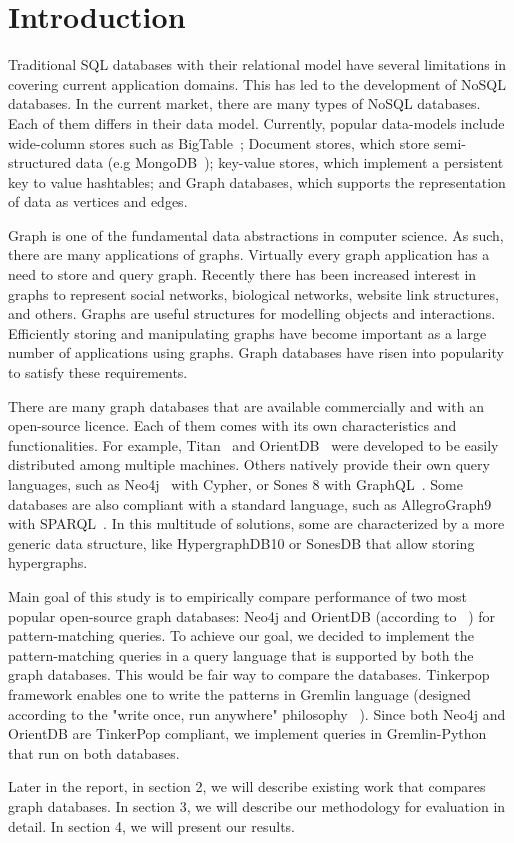 \section{Introduction}

Traditional SQL databases with their relational model have several limitations in covering current application domains. This has led to the development of NoSQL databases. In the current market, there are many types of NoSQL databases. Each of them differs in their data model. Currently, popular data-models include wide-column stores such as BigTable~\cite{chang2008bigtable}; Document stores, which store semi-structured data (e.g MongoDB~\cite{chodorow2013mongodb}); key-value stores, which implement a persistent key to value hashtables; and Graph databases, which supports the representation of data as vertices and edges.

Graph is one of the fundamental data abstractions in computer science. As such, there are many applications of graphs. Virtually every graph application has a need to store and query graph. Recently there has been increased interest in graphs to represent social networks, biological networks, website link structures, and others. Graphs are useful structures for modelling objects and interactions. Efficiently storing and manipulating graphs have become important as a large number of applications using graphs. Graph databases have risen into popularity to satisfy these requirements.

There are many graph databases that are available commercially and with an open-source licence. Each of them comes with its own characteristics and functionalities. For example, Titan~\cite{jouili2013empirical} and OrientDB~\cite{tesoriero2013getting} were developed to be easily distributed among multiple machines. Others natively provide their own query languages, such as Neo4j~\cite{holzschuher2013performance} with Cypher, or Sones 8 with GraphQL~\cite{vazquez2017improving}. Some databases are also compliant with a standard language, such as AllegroGraph9~\cite{abburu2013format} with SPARQL~\cite{abburu2013format}. In this multitude of solutions, some are characterized by a more generic data structure, like HypergraphDB10 or SonesDB that allow storing hypergraphs. 

Main goal of this study is to empirically compare performance of two most popular open-source graph databases: Neo4j and OrientDB (according to ~\cite{dbranking}) for pattern-matching queries. To achieve our goal, we decided to implement the pattern-matching queries in a query language that is supported by both the graph databases. This would be fair way to compare the databases. Tinkerpop ~\cite{tinkerpop} framework enables one to write the patterns in Gremlin language (designed according to the "write once, run anywhere" philosophy ~\cite{gremlin}). Since both Neo4j and OrientDB are TinkerPop compliant, we implement queries in Gremlin-Python that run on both databases. 


Later in the report, in section 2, we will describe existing work that compares graph databases. In section 3, we will describe our methodology for evaluation in detail. In section 4, we will present our results.   




